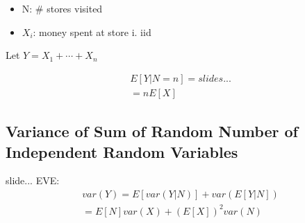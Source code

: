 
\begin{itemize}
    \item N: \# stores visited
    \item $X_i$: money spent at store i. iid
\end{itemize}


Let $Y=X_1+ \cdots + X_n$

\begin{align*}
    E[Y|N=n] = slides...\\
    = nE[X]
\end{align*}

\subsection{Variance of Sum of Random Number of Independent Random Variables}


slide...
EVE:
\begin{align*}
var(Y) = E[var(Y|N)] + var(E[Y|N])\\
 = E[N] var(X) + (E[X])^2 var(N)
\end{align*}
